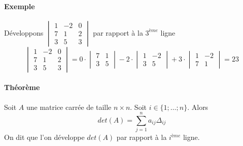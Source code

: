 \paragraph{Exemple} Développons $\begin{vmatrix} 1 & -2 & 0 \\ 7 & 1 & 2 \\ 3 & 5 & 3 \end{vmatrix}$ par rapport à la $3^{ème}$ ligne
$$\begin{vmatrix} 1 & -2 & 0 \\ 7 & 1 & 2 \\ 3 & 5 & 3 \end{vmatrix} = 
  0 \cdot \begin{vmatrix} 7 & 1 \\ 3 & 5 \end{vmatrix} 
  - 2 \cdot \begin{vmatrix} 1 & -2 \\ 3 & 5 \end{vmatrix} 
  + 3 \cdot \begin{vmatrix} 1 & -2 \\ 7 & 1 \end{vmatrix} 
= 23$$

\paragraph{Théorème} Soit $A$ une matrice carrée de taille $n\times n$. Soit $i \in \{1; \ldots; n\}$. Alors
$$det(A) = \sum_{j=1}^{n} a_{ij} \Delta_{ij}$$
On dit que l'on développe $det(A)$ par rapport à la $i^{ème}$ ligne.

